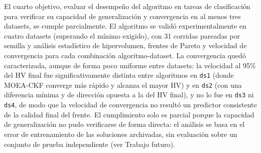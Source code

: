 El cuarto objetivo, evaluar el desempeño del algoritmo en tareas de clasificación para verificar su capacidad de generalización y convergencia en al menos tres datasets, se cumple parcialmente. El algoritmo se validó experimentalmente en cuatro datasets (superando el mínimo exigido), con 31 corridas pareadas por semilla y análisis estadístico de hipervolumen, frentes de Pareto y velocidad de convergencia para cada combinación algoritmo-dataset. La convergencia quedó caracterizada, aunque de forma poco uniforme entre datasets: la velocidad al 95\% del HV final fue significativamente distinta entre algoritmos en \texttt{ds1} (donde MOEA-CKF converge más rápido y alcanza el mayor HV) y en \texttt{ds2} (con una diferencia mínima y de dirección opuesta a la del HV final), y no lo fue en \texttt{ds3} ni \texttt{ds4}, de modo que la velocidad de convergencia no resultó un predictor consistente de la calidad final del frente. El cumplimiento solo es parcial porque la capacidad de generalización no pudo verificarse de forma directa: el análisis se basa en el error de entrenamiento de las soluciones archivadas, sin evaluación sobre un conjunto de prueba independiente (ver Trabajo futuro).


